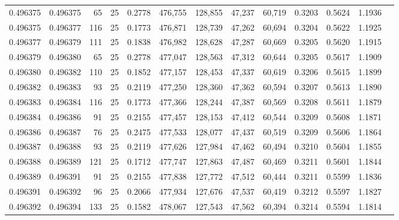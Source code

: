 \begin{tabular}{rrrrrrrrrrrrr}
0.496375 & 0.496375 &    65 &  25 &                                     0.2778 & 476,755 & 128,855 &  47,237 &  60,719 & 0.3203 & 0.5624 & 1.1936 \\
0.496375 & 0.496377 &   116 &  25 &                                     0.1773 & 476,871 & 128,739 &  47,262 &  60,694 & 0.3204 & 0.5622 & 1.1925 \\
0.496377 & 0.496379 &   111 &  25 &                                     0.1838 & 476,982 & 128,628 &  47,287 &  60,669 & 0.3205 & 0.5620 & 1.1915 \\
0.496379 & 0.496380 &    65 &  25 &                                     0.2778 & 477,047 & 128,563 &  47,312 &  60,644 & 0.3205 & 0.5617 & 1.1909 \\
0.496380 & 0.496382 &   110 &  25 &                                     0.1852 & 477,157 & 128,453 &  47,337 &  60,619 & 0.3206 & 0.5615 & 1.1899 \\
0.496382 & 0.496383 &    93 &  25 &                                     0.2119 & 477,250 & 128,360 &  47,362 &  60,594 & 0.3207 & 0.5613 & 1.1890 \\
0.496383 & 0.496384 &   116 &  25 &                                     0.1773 & 477,366 & 128,244 &  47,387 &  60,569 & 0.3208 & 0.5611 & 1.1879 \\
0.496384 & 0.496386 &    91 &  25 &                                     0.2155 & 477,457 & 128,153 &  47,412 &  60,544 & 0.3209 & 0.5608 & 1.1871 \\
0.496386 & 0.496387 &    76 &  25 &                                     0.2475 & 477,533 & 128,077 &  47,437 &  60,519 & 0.3209 & 0.5606 & 1.1864 \\
0.496387 & 0.496388 &    93 &  25 &                                     0.2119 & 477,626 & 127,984 &  47,462 &  60,494 & 0.3210 & 0.5604 & 1.1855 \\
0.496388 & 0.496389 &   121 &  25 &                                     0.1712 & 477,747 & 127,863 &  47,487 &  60,469 & 0.3211 & 0.5601 & 1.1844 \\
0.496389 & 0.496391 &    91 &  25 &                                     0.2155 & 477,838 & 127,772 &  47,512 &  60,444 & 0.3211 & 0.5599 & 1.1836 \\
0.496391 & 0.496392 &    96 &  25 &                                     0.2066 & 477,934 & 127,676 &  47,537 &  60,419 & 0.3212 & 0.5597 & 1.1827 \\
0.496392 & 0.496394 &   133 &  25 &                                     0.1582 & 478,067 & 127,543 &  47,562 &  60,394 & 0.3214 & 0.5594 & 1.1814 \\

\end{tabular}
